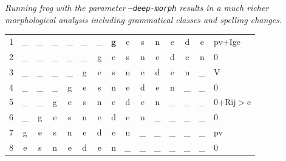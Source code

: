 \documentclass{book}
\begin{document}
{\it Running frog with the parameter {\tt --deep-morph} results in a much richer morphological analysis including grammatical classes and spelling changes}.


\begin{example}
\label{ex-mbma}
\begin{tabular}{lcccccccccccccl}
1 & \_&\_&\_&\_&\_&\_&{\bf g}&e&s&n&e&d&e&pv+Ige\\
2 & \_&\_&\_&\_&\_&g&e&s&n&e&d&e&n&0\\
3 & \_&\_&\_&\_&g&e&s&n&e&d&e&n&\_&V\\
4 & \_&\_&\_&g&e&s&n&e&d&e&n&\_&\_&0\\
5 & \_&\_&g&e&s&n&e&d&e&n&\_&\_&\_&0+Rij$>$e\\
6 &\_&g&e&s&n&e&d&e&n&\_&\_&\_&\_&0\\
7 & g&e&s&n&e&d&e&n&\_&\_&\_&\_&\_&pv\\
8 & e&s&n&e&d&e&n&\_&\_&\_&\_&\_&\_&0\\
\end{tabular}

\end{example}
\end{document}
